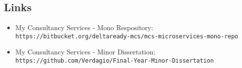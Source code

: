 \subsection*{Links}

\begin{itemize}
\item{My Consultancy Services - Mono Respository: \\ \texttt{https://bitbucket.org/deltaready-mcs/mcs-microservices-mono-repo}}

\item{My Consultancy Services - Minor Dissertation: \\
\texttt{https://github.com/Verdagio/Final-Year-Minor-Dissertation}}

\end{itemize}
